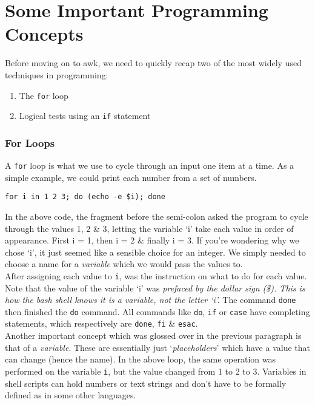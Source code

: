 \section{Some Important Programming Concepts}

Before moving on to awk, we need to quickly recap two of the most widely used techniques in programming:
\begin{enumerate}
  \item The \texttt{for} loop
  \item Logical tests using an \texttt{if} statement
\end{enumerate}

\subsubsection*{For Loops}

\begin{steps}
A \texttt{for} loop is what we use to cycle through an input one item at a time.
As a simple example, we could print each number from a set of numbers.
\begin{lstlisting}
for i in 1 2 3; do (echo -e $i); done
\end{lstlisting}
\end{steps}

\begin{information}
In the above code, the fragment before the semi-colon asked the program to cycle through the values 1, 2 \& 3, letting the variable `i' take each value in order of appearance.
First i = 1, then i = 2 \& finally i = 3.
If you're wondering why we chose `i', it just seemed like a sensible choice for an integer. 
We simply needed to choose a name for a \textit{variable} which we would pass the values to.\\

After assigning each value to \texttt{i}, was the instruction on what to do for each value.
Note that the value of the variable `i' was \textit{prefaced by the dollar sign (\$).
This is how the bash shell knows it is a variable, not the letter `i'.}
The command \texttt{done} then finished the \texttt{do} command.
All commands like \texttt{do}, \texttt{if} or \texttt{case} have completing statements, which respectively are \texttt{done}, \texttt{fi} \& \texttt{esac}.\\

Another important concept which was glossed over in the previous paragraph is that of a \textit{variable}.
These are essentially just `\textit{placeholders}' which have a value that can change (hence the name).
In the above loop, the same operation was performed on the variable \texttt{i}, but the value changed from 1 to 2 to 3.
Variables in shell scripts can hold numbers or text strings and don't have to be formally defined as in some other languages.
\end{information}

